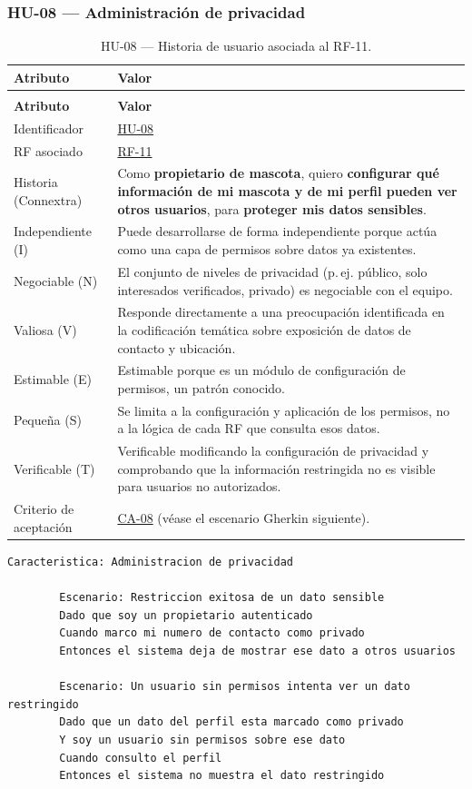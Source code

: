 \documentclass[journal,onecolumn]{IEEEtran}
\makeatletter
\newenvironment{atributos}[2]{%
	\small
	\begin{longtable}{@{}>{\raggedright\arraybackslash}p{4.2cm} >{\raggedright\arraybackslash}p{11.2cm}@{}}
		\caption{#2}\label{tab:#1}\\
		\toprule
		\textbf{Atributo} & \textbf{Valor} \\
		\midrule
		\endfirsthead
		\multicolumn{2}{@{}l}{\small\itshape (continuación)}\\
		\toprule
		\textbf{Atributo} & \textbf{Valor} \\
		\midrule
		\endhead
		\bottomrule
		\endlastfoot
	}{%
	\end{longtable}
	\normalsize
}
\makeatother
\begin{document}
	\subsubsection{HU-08 --- Administración de privacidad}
	
	\begin{atributos}{HU-08}{HU-08 --- Historia de usuario asociada al RF-11.}
		Identificador & \hyperref[tab:HU-08]{HU-08} \\
		RF asociado & \hyperref[tab:RF-11]{RF-11} \\
		Historia (Connextra) & Como \textbf{propietario de mascota}, quiero \textbf{configurar qué información de mi mascota y de mi perfil pueden ver otros usuarios}, para \textbf{proteger mis datos sensibles}. \\
		Independiente (I) & Puede desarrollarse de forma independiente porque actúa como una capa de permisos sobre datos ya existentes. \\
		Negociable (N) & El conjunto de niveles de privacidad (p.\,ej. público, solo interesados verificados, privado) es negociable con el equipo. \\
		Valiosa (V) & Responde directamente a una preocupación identificada en la codificación temática sobre exposición de datos de contacto y ubicación. \\
		Estimable (E) & Estimable porque es un módulo de configuración de permisos, un patrón conocido. \\
		Pequeña (S) & Se limita a la configuración y aplicación de los permisos, no a la lógica de cada RF que consulta esos datos. \\
		Verificable (T) & Verificable modificando la configuración de privacidad y comprobando que la información restringida no es visible para usuarios no autorizados. \\
		Criterio de aceptación & \hyperref[lst:ca08]{CA-08} (véase el escenario Gherkin siguiente). \\
	\end{atributos}
	
	\begin{lstlisting}[style=gherkin,caption={CA-08 --- Escenario de aceptación de la historia HU-08.},label={lst:ca08}]
		Caracteristica: Administracion de privacidad
		
		Escenario: Restriccion exitosa de un dato sensible
		Dado que soy un propietario autenticado
		Cuando marco mi numero de contacto como privado
		Entonces el sistema deja de mostrar ese dato a otros usuarios
		
		Escenario: Un usuario sin permisos intenta ver un dato restringido
		Dado que un dato del perfil esta marcado como privado
		Y soy un usuario sin permisos sobre ese dato
		Cuando consulto el perfil
		Entonces el sistema no muestra el dato restringido
	\end{lstlisting}
	
\end{document}
